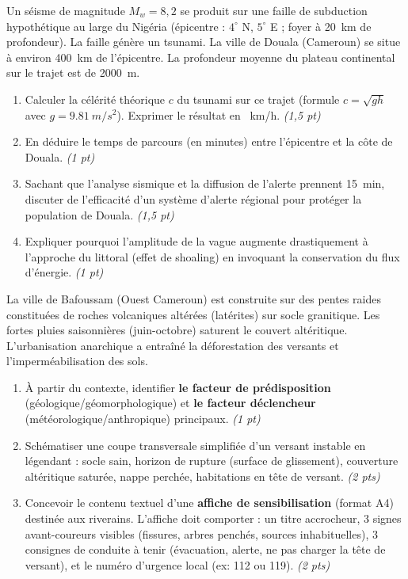 \documentclass[11pt]{article}
\begin{document}
\begin{exercice}
\noindent Un séisme de magnitude $M_w = 8,2$ se produit sur une faille de subduction hypothétique au large du Nigéria (épicentre : $4^\circ$ N, $5^\circ$ E ; foyer à \SI{20}{km} de profondeur). La faille génère un tsunami. La ville de Douala (Cameroun) se situe à environ \SI{400}{km} de l'épicentre. La profondeur moyenne du plateau continental sur le trajet est de \SI{2000}{m}.

\begin{enumerate}
    \item Calculer la célérité théorique $c$ du tsunami sur ce trajet (formule $c = \sqrt{g h}$ avec $g = \SI{9,81}{m/s^2}$). Exprimer le résultat en \SI{}{km/h}. \textit{(1,5 pt)}
    \item En déduire le temps de parcours (en minutes) entre l'épicentre et la côte de Douala. \textit{(1 pt)}
    \item Sachant que l'analyse sismique et la diffusion de l'alerte prennent \SI{15}{min}, discuter de l'efficacité d'un système d'alerte régional pour protéger la population de Douala. \textit{(1,5 pt)}
    \item Expliquer pourquoi l'amplitude de la vague augmente drastiquement à l'approche du littoral (effet de shoaling) en invoquant la conservation du flux d'énergie. \textit{(1 pt)}
\end{enumerate}
\end{exercice}

\begin{exercice}
\noindent La ville de Bafoussam (Ouest Cameroun) est construite sur des pentes raides constituées de roches volcaniques altérées (latérites) sur socle granitique. Les fortes pluies saisonnières (juin-octobre) saturent le couvert altéritique. L'urbanisation anarchique a entraîné la déforestation des versants et l'imperméabilisation des sols.

\begin{enumerate}
    \item À partir du contexte, identifier \textbf{le facteur de prédisposition} (géologique/géomorphologique) et \textbf{le facteur déclencheur} (météorologique/anthropique) principaux. \textit{(1 pt)}
    \item Schématiser une coupe transversale simplifiée d'un versant instable en légendant : socle sain, horizon de rupture (surface de glissement), couverture altéritique saturée, nappe perchée, habitations en tête de versant. \textit{(2 pts)}
    \item Concevoir le contenu textuel d'une \textbf{affiche de sensibilisation} (format A4) destinée aux riverains. L'affiche doit comporter : un titre accrocheur, 3 signes avant-coureurs visibles (fissures, arbres penchés, sources inhabituelles), 3 consignes de conduite à tenir (évacuation, alerte, ne pas charger la tête de versant), et le numéro d'urgence local (ex: 112 ou 119). \textit{(2 pts)}
\end{enumerate}
\end{exercice}
\end{document}

